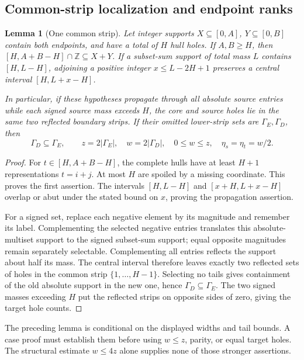 \documentclass[11pt,letterpaper]{article}
\newcommand{\Z}{\mathbb Z}\newcommand{\R}{\mathbb R}
\newcommand{\card}[1]{\lvert#1\rvert}
\newtheorem{lemma}[theorem]{Lemma}
\theoremstyle{definition}\newtheorem{definition}[theorem]{Definition}
\begin{document}
\subsection{Common-strip localization and endpoint ranks}
\begin{lemma}[One common strip]\label{lem:common-strip}
Let integer supports $X\subseteq[0,A]$, $Y\subseteq[0,B]$ contain
both endpoints, and have a total of $H$ hull holes. If $A,B\ge H$,
then $[H,A+B-H]\cap\Z\subseteq X+Y$.
If a subset-sum support of total mass $L$ contains $[H,L-H]$,
adjoining a positive integer $x\le L-2H+1$ preserves a central
interval $[H,L+x-H]$.

In particular, if these hypotheses propagate through all absolute
source entries while each signed source mass exceeds $H$, the core
and source holes lie in the same two reflected boundary strips. If
their omitted lower-strip sets are $\Gamma_E,\Gamma_D$, then
\[
\Gamma_D\subseteq\Gamma_E,\qquad
z=2\card{\Gamma_E},\quad w=2\card{\Gamma_D},\quad
0\le w\le z,\quad\eta_s=\eta_t=w/2.
\]
\end{lemma}
\begin{proof}
For $t\in[H,A+B-H]$, the complete hulls have at least $H+1$
representations $t=i+j$. At most $H$ are spoiled by a missing
coordinate. This proves the first assertion. The intervals
$[H,L-H]$ and $[x+H,L+x-H]$ overlap or abut under the stated bound
on $x$, proving the propagation assertion.

For a signed set, replace each negative element by its magnitude and
remember its label. Complementing the selected negative entries
translates this absolute-multiset support to the signed subset-sum
support; equal opposite magnitudes remain separately selectable.
Complementing all entries reflects the support about half its mass.
The central interval therefore leaves exactly two reflected sets
of holes in the common strip $\{1,\ldots,H-1\}$. Selecting no tails
gives containment of the old absolute support in the new one, hence
$\Gamma_D\subseteq\Gamma_E$. The two signed masses exceeding $H$
put the reflected strips on opposite sides of zero, giving the target
hole counts.
\end{proof}

The preceding lemma is conditional on the displayed widths and tail
bounds. A case proof must establish them before using $w\le z$,
parity, or equal target holes. The structural estimate $w\le4z$
alone supplies none of those stronger assertions.
\end{document}
